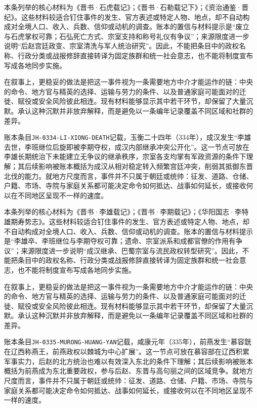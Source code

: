 本条列举的核心材料为《晋书·石虎载记》；《晋书·石勒载记下》；《资治通鉴·晋纪》。这些材料较适合钉住事件的发生、官方表述或特定人物、地点，却不自动构成对全境人口、收入、兵数、信仰或动机的调查。账本的置信与材料提示是“废立与石虎掌权可靠；石弘死亡方式、宗室支持和称号礼仪有争议”；来源限度进一步说明“后赵宫廷政变、宗室清洗与军人统治研究”。因此，不能把条目中的政权名称、行政分类或战报修辞直接转译为固定族群和统一社会意志，也不能将制度宣布写成各地同步实施。

在叙事上，更稳妥的做法是把这一事件视为一条需要地方中介才能运作的链：中央的命令、地方官与精英的选择、运输与劳力的条件、以及普通家庭可能面对的迁徙、赋役或安全风险彼此相连。现有材料能够显示其中若干环节，却保留了大量沉默。承认这种沉默并非放弃解释，而是避免以一条编年记录覆盖不同区域和社群的差异。

账本条目\texttt{JH-0334-LI-XIONG-DEATH}记载，玉衡二十四年（334年），成汉发生“李雄去世，李班继位后旋即被李期夺权，成汉内部继承冲突公开化”。这一节点可放在李雄长期统治下未能建立无争议的继承秩序，宗室各支均掌有军政资源的条件下理解；其后续影响被账本概括为成汉从相对稳定转入频繁宫廷冲突，削弱其抵御东晋北伐的能力。就地方尺度而言，事件并不只属于朝廷或统帅：征发、道路、仓储、户籍、市场、寺院与家庭关系都可能决定命令如何抵达、战事如何延长，或接收何以在不同地区呈现不一样的速度。

本条列举的核心材料为《晋书·李雄载记》；《晋书·李期载记》；《华阳国志·李特雄期寿势志》。这些材料较适合钉住事件的发生、官方表述或特定人物、地点，却不自动构成对全境人口、收入、兵数、信仰或动机的调查。账本的置信与材料提示是“李雄卒、李班继位与李期夺权可靠；遗命、宗室派系和成都官僚的作用有争议”；来源限度进一步说明“成汉继承、巴蜀宗室与流民政权转型研究”。因此，不能把条目中的政权名称、行政分类或战报修辞直接转译为固定族群和统一社会意志，也不能将制度宣布写成各地同步实施。

在叙事上，更稳妥的做法是把这一事件视为一条需要地方中介才能运作的链：中央的命令、地方官与精英的选择、运输与劳力的条件、以及普通家庭可能面对的迁徙、赋役或安全风险彼此相连。现有材料能够显示其中若干环节，却保留了大量沉默。承认这种沉默并非放弃解释，而是避免以一条编年记录覆盖不同区域和社群的差异。

账本条目\texttt{JH-0335-MURONG-HUANG-YAN}记载，咸康元年（335年），前燕发生“慕容皝在辽西称燕王，前燕政权以棘城为中心扩展”。这一节点可放在慕容部在辽西积累军事实力，后赵的北方统治也难以有效深入东北的条件下理解；其后续影响被账本概括为前燕成为东北重要政权，参与后赵、东晋与高句丽之间的区域竞争。就地方尺度而言，事件并不只属于朝廷或统帅：征发、道路、仓储、户籍、市场、寺院与家庭关系都可能决定命令如何抵达、战事如何延长，或接收何以在不同地区呈现不一样的速度。


